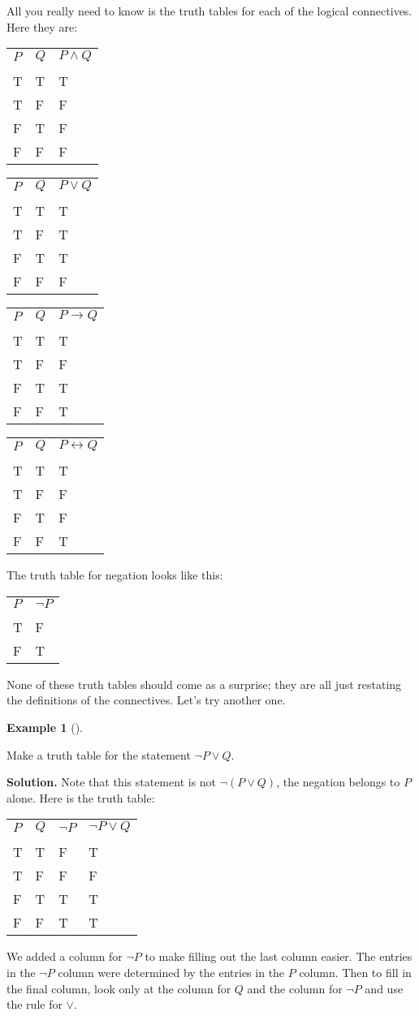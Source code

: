 \documentclass[10pt,]{book}
\theoremstyle{plain}
\theoremstyle{definition}
\newtheorem{example}[theorem]{Example}
\theoremstyle{definition}
\theoremstyle{definition}
\numberwithin{equation}{chapter}
\newcommand{\hrulethin}  {\noalign{\hrule height 0.04em}}
\def\iff{\leftrightarrow}
\def\imp{\rightarrow}
\begin{document}
          All you really need to know is the truth tables for each of the logical connectives. Here they are:
\begin{tabular}{lll}
\(P\)&\(Q\)&\(P\wedge Q\)\tabularnewline[0pt]
&&\tabularnewline\hrulethin
T&T&T\tabularnewline[0pt]
T&F&F\tabularnewline[0pt]
F&T&F\tabularnewline[0pt]
F&F&F
\end{tabular}
\begin{tabular}{lll}
\(P\)&\(Q\)&\(P\vee Q\)\tabularnewline[0pt]
&&\tabularnewline\hrulethin
T&T&T\tabularnewline[0pt]
T&F&T\tabularnewline[0pt]
F&T&T\tabularnewline[0pt]
F&F&F
\end{tabular}
\begin{tabular}{lll}
\(P\)&\(Q\)&\(P\imp Q\)\tabularnewline[0pt]
&&\tabularnewline\hrulethin
T&T&T\tabularnewline[0pt]
T&F&F\tabularnewline[0pt]
F&T&T\tabularnewline[0pt]
F&F&T
\end{tabular}
\begin{tabular}{lll}
\(P\)&\(Q\)&\(P\iff Q\)\tabularnewline[0pt]
&&\tabularnewline\hrulethin
T&T&T\tabularnewline[0pt]
T&F&F\tabularnewline[0pt]
F&T&F\tabularnewline[0pt]
F&F&T
\end{tabular}
\par

          The truth table for negation looks like this:
\begin{tabular}{ll}
\(P\)&\(\neg P\)\tabularnewline[0pt]
&\tabularnewline\hrulethin
T&F\tabularnewline[0pt]
F&T\tabularnewline[0pt]

\end{tabular}
\par

          None of these truth tables should come as a surprise; they are all just restating the definitions of the connectives. Let's try another one.
\begin{example}[]\label{example-83}

              Make a truth table for the statement \(\neg P \vee Q\).
\par\medskip\noindent%
\textbf{Solution.}\quad
              Note that this statement is not \(\neg(P \vee Q)\), the negation belongs to \(P\) alone. Here is the truth table:
\begin{tabular}{llll}
\(P\)&\(Q\)&\(\neg P\)&\(\neg P \vee Q\)\tabularnewline[0pt]
&&&\tabularnewline\hrulethin
T&T&F&T\tabularnewline[0pt]
T&F&F&F\tabularnewline[0pt]
F&T&T&T\tabularnewline[0pt]
F&F&T&T
\end{tabular}
\par

              We added a column for \(\neg P\) to make filling out the last column easier. The entries in the \(\neg P\) column were determined by the entries in the \(P\) column. Then to fill in the final column, look only at the column for \(Q\) and the column for \(\neg P\) and use the rule for \(\vee\).
\end{example}
\par
\end{document}
